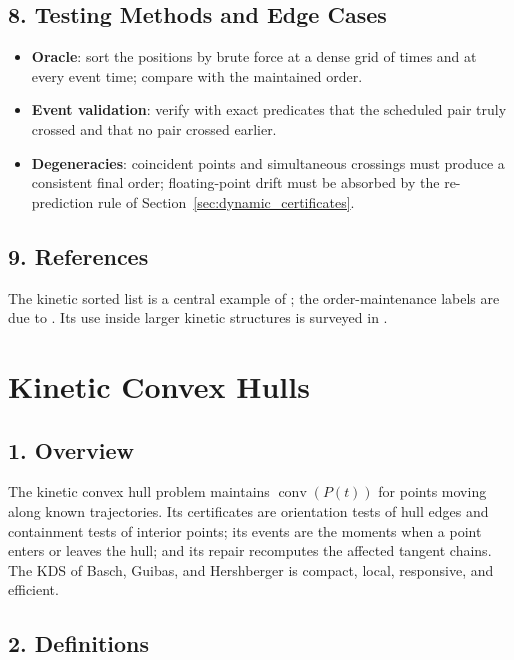 \subsection{8. Testing Methods and Edge Cases}

\begin{itemize}
  \item \textbf{Oracle}: sort the positions by brute force at a dense grid of
    times and at every event time; compare with the maintained order.
  \item \textbf{Event validation}: verify with exact predicates that the
    scheduled pair truly crossed and that no pair crossed earlier.
  \item \textbf{Degeneracies}: coincident points and simultaneous crossings
    must produce a consistent final order; floating-point drift must be
    absorbed by the re-prediction rule of Section~\ref{sec:dynamic_certificates}.
\end{itemize}

\subsection{9. References}

The kinetic sorted list is a central example of \cite{basch1999,guibas1998};
the order-maintenance labels are due to \cite{dietzsleator1987}. Its use
inside larger kinetic structures is surveyed in \cite{guibas1998,mehta2005}.

\section{Kinetic Convex Hulls}
\label{sec:dynamic_kinetic_hulls}

\subsection{1. Overview}

The kinetic convex hull problem maintains $\operatorname{conv}(P(t))$ for
points moving along known trajectories. Its certificates are orientation
tests of hull edges and containment tests of interior points; its events are
the moments when a point enters or leaves the hull; and its repair
recomputes the affected tangent chains. The KDS of Basch, Guibas, and
Hershberger \cite{basch1999} is compact, local, responsive, and efficient.

\subsection{2. Definitions}

